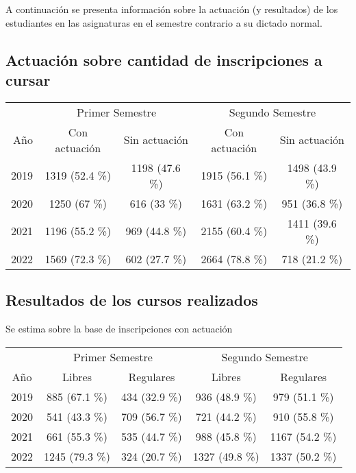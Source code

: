 \documentclass[
]{article}
\begin{document}
A continuación se presenta información sobre la actuación (y resultados)
de los estudiantes en las asignaturas en el semestre contrario a su
dictado normal.

\hypertarget{actuaciuxf3n-sobre-cantidad-de-inscripciones-a-cursar}{%
\subsection{Actuación sobre cantidad de inscripciones a
cursar}\label{actuaciuxf3n-sobre-cantidad-de-inscripciones-a-cursar}}

\begin{longtable}{rcccc}
\toprule
 & \multicolumn{2}{c}{Primer Semestre} & \multicolumn{2}{c}{Segundo Semestre} \\ 
\cmidrule(lr){2-3} \cmidrule(lr){4-5}
Año & Con actuación & Sin actuación & Con actuación & Sin actuación \\ 
\midrule
2019 & 1319 (52.4 \%) & 1198 (47.6 \%) & 1915 (56.1 \%) & 1498 (43.9 \%) \\ 
2020 & 1250 (67 \%) & 616 (33 \%) & 1631 (63.2 \%) & 951 (36.8 \%) \\ 
2021 & 1196 (55.2 \%) & 969 (44.8 \%) & 2155 (60.4 \%) & 1411 (39.6 \%) \\ 
2022 & 1569 (72.3 \%) & 602 (27.7 \%) & 2664 (78.8 \%) & 718 (21.2 \%) \\ 
\bottomrule
\end{longtable}

\hypertarget{resultados-de-los-cursos-realizados}{%
\subsection{Resultados de los cursos
realizados}\label{resultados-de-los-cursos-realizados}}

Se estima sobre la base de inscripciones con actuación

\begin{longtable}{ccccc}
\toprule
 & \multicolumn{2}{c}{Primer Semestre} & \multicolumn{2}{c}{Segundo Semestre} \\ 
\cmidrule(lr){2-3} \cmidrule(lr){4-5}
Año & Libres & Regulares & Libres & Regulares \\ 
\midrule
2019 & 885 (67.1 \%) & 434 (32.9 \%) & 936 (48.9 \%) & 979 (51.1 \%) \\ 
2020 & 541 (43.3 \%) & 709 (56.7 \%) & 721 (44.2 \%) & 910 (55.8 \%) \\ 
2021 & 661 (55.3 \%) & 535 (44.7 \%) & 988 (45.8 \%) & 1167 (54.2 \%) \\ 
2022 & 1245 (79.3 \%) & 324 (20.7 \%) & 1327 (49.8 \%) & 1337 (50.2 \%) \\ 
\bottomrule
\end{longtable}
\end{document}
